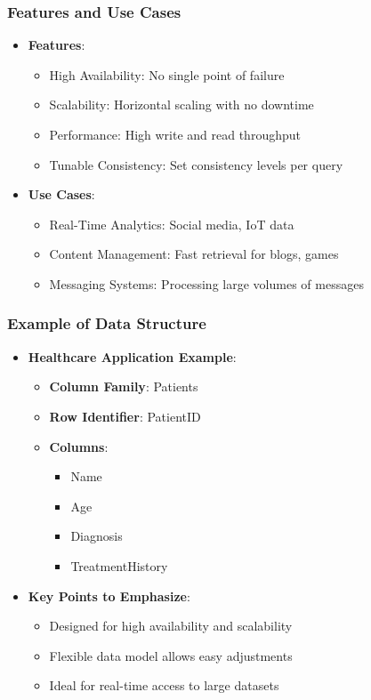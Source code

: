 \documentclass[aspectratio=169]{beamer}
\begin{document}
\begin{frame}[fragile]
    \frametitle{Features and Use Cases}
    \begin{itemize}
        \item \textbf{Features}:
        \begin{itemize}
            \item High Availability: No single point of failure
            \item Scalability: Horizontal scaling with no downtime
            \item Performance: High write and read throughput
            \item Tunable Consistency: Set consistency levels per query
        \end{itemize}
        
        \item \textbf{Use Cases}:
        \begin{itemize}
            \item Real-Time Analytics: Social media, IoT data
            \item Content Management: Fast retrieval for blogs, games
            \item Messaging Systems: Processing large volumes of messages
        \end{itemize}
    \end{itemize}
\end{frame}

\begin{frame}[fragile]
    \frametitle{Example of Data Structure}
    \begin{itemize}
        \item \textbf{Healthcare Application Example}:
        \begin{itemize}
            \item \textbf{Column Family}: Patients
            \item \textbf{Row Identifier}: PatientID
            \item \textbf{Columns}:
            \begin{itemize}
                \item Name
                \item Age
                \item Diagnosis
                \item TreatmentHistory
            \end{itemize}
        \end{itemize}
        
        \item \textbf{Key Points to Emphasize}:
        \begin{itemize}
            \item Designed for high availability and scalability
            \item Flexible data model allows easy adjustments
            \item Ideal for real-time access to large datasets
        \end{itemize}
    \end{itemize}
\end{frame}
\end{document}

